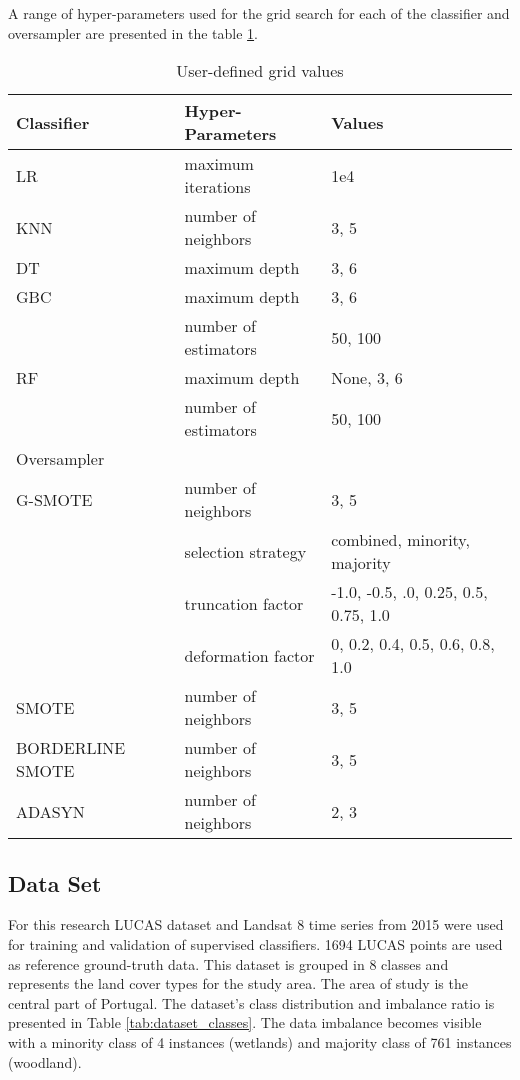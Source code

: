 \documentclass[parskip=full]{scrartcl}
\begin{document}
A range of hyper-parameters used for the grid search for each of the
classifier and oversampler are presented in the table \ref{tab:datasets}.

\begin{table}[H]
	\centering
	\begin{tabular}{lll}
		\toprule
		Classifier       & Hyper-Parameters & Values\\
		\toprule
		LR               & maximum iterations   & 1e4   \\
		KNN              & number of neighbors  & {3, 5} \\
		DT               & maximum depth        & {3, 6} \\
		GBC              & maximum depth        & {3, 6} \\
    			 		 & number of estimators & {50, 100} \\
		RF               & maximum depth        &  {None, 3, 6} \\
				 		 & number of estimators & {50, 100} \\
		\toprule
		Oversampler      &                      & \\
		\toprule
		G-SMOTE          & number of neighbors  & {3, 5} \\
				 		 & selection strategy   & combined, minority, majority\\
				 		 & truncation factor    & {-1.0, -0.5, .0, 0.25,
				 		 0.5, 0.75, 1.0} \\
				 		 & deformation factor   & {0, 0.2, 0.4, 0.5,
				 		 0.6, 0.8, 1.0} \\
 		SMOTE            & number of neighbors & {3, 5} \\
		BORDERLINE SMOTE & number of neighbors & {3, 5} \\
		ADASYN           & number of neighbors & {2, 3} \\
		\bottomrule
	\end{tabular}
	\caption{\label{tab:datasets}User-defined grid values}
\end{table}


\subsection{Data Set}

For this research LUCAS dataset and Landsat 8 time series from 2015 were used
for training and validation of supervised classifiers. 1694 LUCAS points are
used as reference ground-truth data. This dataset is grouped in 8 classes and
represents the land cover types for the study area. The area of study is the
central part of Portugal. The dataset's class distribution and imbalance ratio
is presented in Table \ref{tab:dataset_classes}. The data imbalance becomes
visible with a minority class of 4 instances (wetlands) and majority class of
761 instances (woodland).
\end{document}
